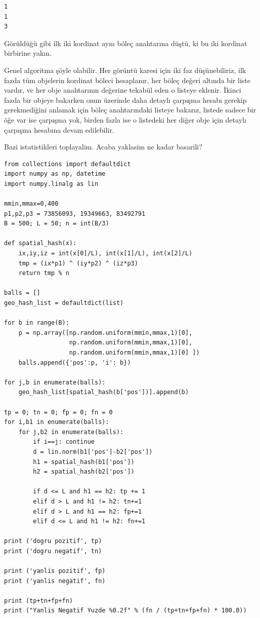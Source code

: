 \documentclass[12pt,fleqn]{article}\usepackage{../../common}
\begin{document}
\begin{verbatim}
1
1
3
\end{verbatim}

Görüldüğü gibi ilk iki kordinat aynı böleç anahtarına düştü, ki bu iki kordinat
birbirine yakın.

Genel algoritma şöyle olabilir. Her görüntü karesi için iki faz düşünebiliriz,
ilk fazda tüm objelerin kordinat böleci hesaplanır, her böleç değeri altında bir
liste vardır, ve her obje anahtarının değerine tekabül eden o listeye
eklenir. İkinci fazda bir objeye bakarken onun üzerinde daha detaylı çarpışma
hesabı gerekip gerekmediğini anlamak için böleç anahtarındaki listeye bakarız,
listede sadece bir öğe var ise çarpışma yok, birden fazla ise o listedeki her
diğer obje için detaylı çarpışma hesabına devam edilebilir.

Bazi istatistikleri toplayalim. Acaba yaklasim ne kadar basarili?

\begin{verbatim}
from collections import defaultdict 
import numpy as np, datetime
import numpy.linalg as lin

mmin,mmax=0,400
p1,p2,p3 = 73856093, 19349663, 83492791
B = 500; L = 50; n = int(B/3)

def spatial_hash(x):
    ix,iy,iz = int(x[0]/L), int(x[1]/L), int(x[2]/L)
    tmp = (ix*p1) ^ (iy*p2) ^ (iz*p3)
    return tmp % n
    
balls = []
geo_hash_list = defaultdict(list)

for b in range(B):
    p = np.array([np.random.uniform(mmin,mmax,1)[0],
                  np.random.uniform(mmin,mmax,1)[0],
                  np.random.uniform(mmin,mmax,1)[0] ])
    balls.append({'pos':p, 'i': b})

for j,b in enumerate(balls):
    geo_hash_list[spatial_hash(b['pos'])].append(b)

tp = 0; tn = 0; fp = 0; fn = 0
for i,b1 in enumerate(balls):
    for j,b2 in enumerate(balls):
        if i==j: continue
        d = lin.norm(b1['pos']-b2['pos'])
        h1 = spatial_hash(b1['pos'])
        h2 = spatial_hash(b2['pos'])
        
        if d <= L and h1 == h2: tp += 1        
        elif d > L and h1 != h2: tn+=1
        elif d > L and h1 == h2: fp+=1
        elif d <= L and h1 != h2: fn+=1

print ('dogru pozitif', tp)
print ('dogru negatif', tn)

print ('yanlis pozitif', fp)
print ('yanlis negatif', fn)

print (tp+tn+fp+fn)
print ("Yanlis Negatif Yuzde %0.2f" % (fn / (tp+tn+fp+fn) * 100.0))
\end{verbatim}
\end{document}
